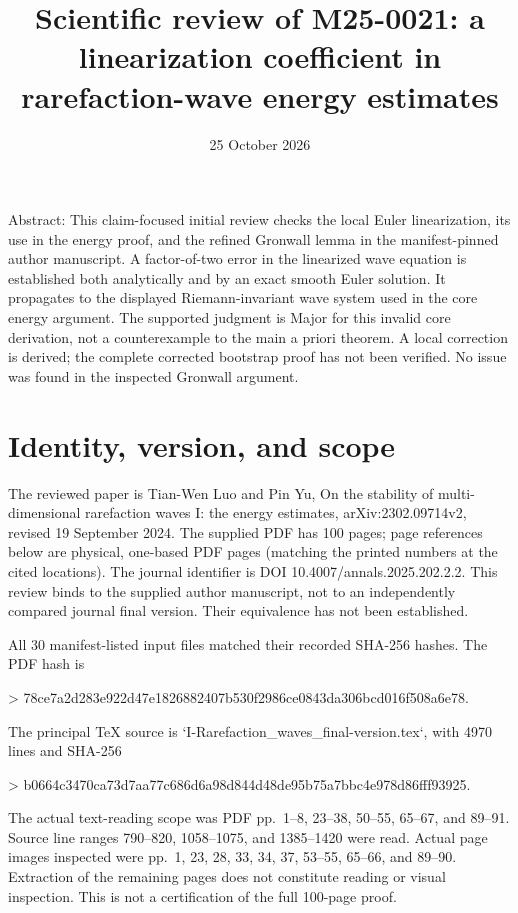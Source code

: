 \documentclass[10pt]{article}
\title{Scientific review of M25-0021:
a linearization coefficient in rarefaction-wave energy estimates}
\author{}
\date{25 October 2026}
\begin{document}
\maketitle
Abstract: This claim-focused initial review checks the local Euler linearization, its use in the energy proof, and the refined Gronwall lemma in the manifest-pinned author manuscript. A factor-of-two error in the linearized wave equation is established both analytically and by an exact smooth Euler solution. It propagates to the displayed Riemann-invariant wave system used in the core energy argument. The supported judgment is Major for this invalid core derivation, not a counterexample to the main a priori theorem. A local correction is derived; the complete corrected bootstrap proof has not been verified. No issue was found in the inspected Gronwall argument.\par
\section*{Identity, version, and scope}
The reviewed paper is Tian-Wen Luo and Pin Yu, On the stability of multi-dimensional rarefaction waves I: the energy estimates, arXiv:2302.09714v2, revised 19 September 2024. The supplied PDF has 100 pages; page references below are physical, one-based PDF pages (matching the printed numbers at the cited locations). The journal identifier is DOI 10.4007/annals.2025.202.2.2. This review binds to the supplied author manuscript, not to an independently compared journal final version. Their equivalence has not been established.\par
All 30 manifest-listed input files matched their recorded SHA-256 hashes. The PDF hash is\par
> 78ce7a2d283e922d47e1826882407b530f2986ce0843da306bcd016f508a6e78.\par
The principal TeX source is `I-Rarefaction\_waves\_final-version.tex`, with 4970 lines and SHA-256\par
> b0664c3470ca73d7aa77c686d6a98d844d48de95b75a7bbc4e978d86fff93925.\par
The actual text-reading scope was PDF pp. 1–8, 23–38, 50–55, 65–67, and 89–91. Source line ranges 790–820, 1058–1075, and 1385–1420 were read. Actual page images inspected were pp. 1, 23, 28, 33, 34, 37, 53–55, 65–66, and 89–90. Extraction of the remaining pages does not constitute reading or visual inspection. This is not a certification of the full 100-page proof.\par
\end{document}
